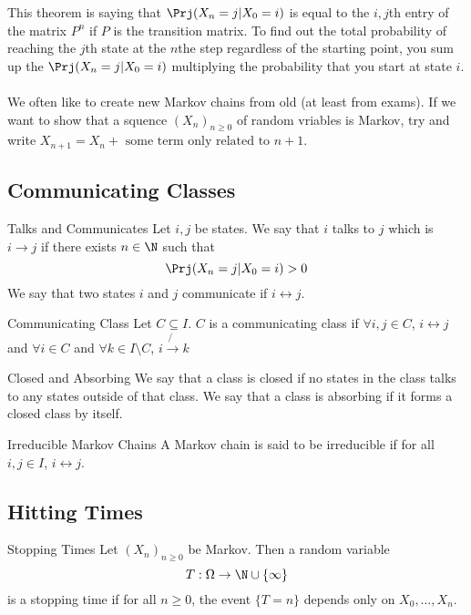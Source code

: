 \documentclass[a4paper]{article}
\begin{document}
This theorem is saying that $\Prj(X_n=j|X_0=i)$ is equal to the $i,j$th entry of the matrix $P^n$ if $P$ is the transition matrix. To find out the total probability of reaching the $j$th state at the $n$the step regardless of the starting point, you sum up the $\Prj(X_n=j|X_0=i)$ multiplying the probability that you start at state $i$. \\~\\

We often like to create new Markov chains from old (at least from exams). If we want to show that a squence $(X_n)_{n\geq 0}$ of random vriables is Markov, try and write $X_{n+1}=X_n+\text{ some term only related to }n+1$. 

\subsection{Communicating Classes}
\begin{defn}{Talks and Communicates}{} Let $i,j$ be states. We say that $i$ talks to $j$ which is $i\rightarrow j$ if there exists $n\in\N$ such that $$\Prj(X_n=j|X_0=i)>0$$ We say that two states $i$ and $j$ communicate if $i\leftrightarrow j$. 
\end{defn}

\begin{defn}{Communicating Class}{} Let $C\subseteq I$. $C$ is a communicating class if $\forall i,j\in C$, $i\leftrightarrow j$ and $\forall i\in C$ and $\forall k\in I\setminus C$, $i\not{\rightarrow} k$ 
\end{defn}

\begin{defn}{Closed and Absorbing}{} We say that a class is closed if no states in the class talks to any states outside of that class. We say that a class is absorbing if it forms a closed class by itself. 
\end{defn}

\begin{defn}{Irreducible Markov Chains}{} A Markov chain is said to be irreducible if for all $i,j\in I$, $i\leftrightarrow j$. 
\end{defn}

\subsection{Hitting Times}
\begin{defn}{Stopping Times}{} Let $(X_n)_{n\geq 0}$ be Markov. Then a random variable $$T:\Omega\to\N\cup\{\infty\}$$ is a stopping time if for all $n\geq 0$, the event $\{T=n\}$ depends only on $X_0,\dots,X_n$. 
\end{defn}
\end{document}
